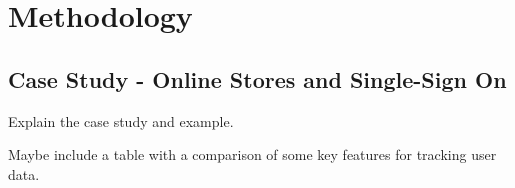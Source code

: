 \chapter{Methodology}
\label{ch:methodology}

%
%
\section{Case Study - Online Stores and Single-Sign On}
\label{sec:methodology:caseStudy}
Explain the case study and example.




Maybe include a table with a comparison of some key features for tracking user data.